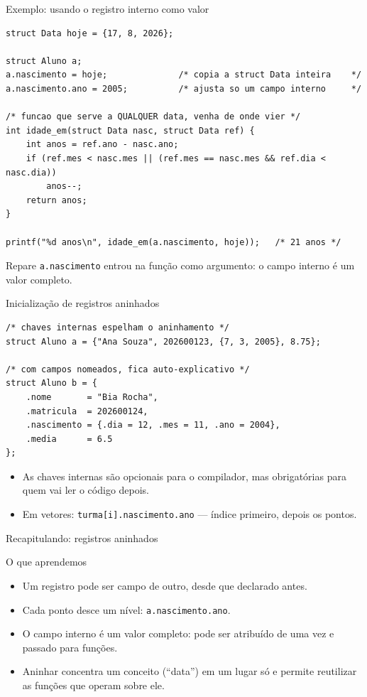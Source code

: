 \documentclass[aspectratio=169]{beamer}
\begin{document}
\begin{frame}[fragile]{Exemplo: usando o registro interno como valor}
\begin{lstlisting}[basicstyle=\ttfamily\tiny]
struct Data hoje = {17, 8, 2026};

struct Aluno a;
a.nascimento = hoje;              /* copia a struct Data inteira    */
a.nascimento.ano = 2005;          /* ajusta so um campo interno     */

/* funcao que serve a QUALQUER data, venha de onde vier */
int idade_em(struct Data nasc, struct Data ref) {
    int anos = ref.ano - nasc.ano;
    if (ref.mes < nasc.mes || (ref.mes == nasc.mes && ref.dia < nasc.dia))
        anos--;
    return anos;
}

printf("%d anos\n", idade_em(a.nascimento, hoje));   /* 21 anos */
\end{lstlisting}
  \begin{exampleblock}{Repare}
    \texttt{a.nascimento} entrou na função como argumento: o campo interno é
    um valor completo.
  \end{exampleblock}
\end{frame}

\begin{frame}[fragile]{Inicialização de registros aninhados}
\begin{lstlisting}[basicstyle=\ttfamily\scriptsize]
/* chaves internas espelham o aninhamento */
struct Aluno a = {"Ana Souza", 202600123, {7, 3, 2005}, 8.75};

/* com campos nomeados, fica auto-explicativo */
struct Aluno b = {
    .nome       = "Bia Rocha",
    .matricula  = 202600124,
    .nascimento = {.dia = 12, .mes = 11, .ano = 2004},
    .media      = 6.5
};
\end{lstlisting}
  \begin{itemize}
    \item As chaves internas são opcionais para o compilador, mas obrigatórias
      para quem vai ler o código depois.
    \item Em vetores: \texttt{turma[i].nascimento.ano} --- índice primeiro,
      depois os pontos.
  \end{itemize}
\end{frame}

\begin{frame}{Recapitulando: registros aninhados}
  \begin{block}{O que aprendemos}
    \begin{itemize}
      \item Um registro pode ser campo de outro, desde que declarado antes.
      \item Cada ponto desce um nível: \texttt{a.nascimento.ano}.
      \item O campo interno é um valor completo: pode ser atribuído de uma vez e
        passado para funções.
      \item Aninhar concentra um conceito (``data'') em um lugar só e permite
        reutilizar as funções que operam sobre ele.
    \end{itemize}
  \end{block}
\end{frame}
\end{document}
